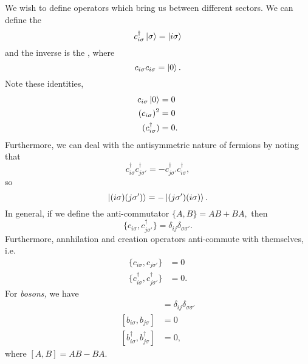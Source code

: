\documentclass{article}
\numberwithin{equation}{section}
\begin{document}
We wish to define operators which bring us between different sectors. We can define the 
\begin{equation*}
    c^\dagger_{i\sigma}\ket{\sigma} = \ket{i\sigma}
\end{equation*}
and the inverse is the , where
\begin{equation*}
    c_{i\sigma}c_{i\sigma} = \ket{0}.
\end{equation*}
Note these identities, 
\begin{align*}
    c_{i\sigma}\ket{0} &= 0 \\ 
    (c_{i\sigma})^2 &= 0 \\ 
    (c^\dagger_{i\sigma}) &= 0.
\end{align*}
Furthermore, we can deal with the antisymmetric nature of fermions by noting that 
\begin{equation*}
    c^\dagger_{i\sigma}c^\dagger_{j\sigma'} = -c^\dagger_{j\sigma'}c^\dagger_{i\sigma},
\end{equation*}
so
\begin{equation*}
    \ket{(i\sigma)(j\sigma')} = -\ket{(j\sigma')(i\sigma)}.
\end{equation*}
In general, if we define the anti-commutator $\{A,B\}=AB+BA,$ then 
\begin{equation}
    \{c_{i\sigma},c^\dagger_{j\sigma'}\} = \delta_{ij}\delta_{\sigma\sigma'}.
\end{equation}
Furthermore, annhilation and creation operators anti-commute with themselves, i.e. 
\begin{align*}
    \{c_{i\sigma}, c_{j\sigma'}\} &= 0 \\
    \{c^\dagger_{i\sigma}, c^\dagger_{j\sigma'}\} &= 0.
\end{align*}
For \textit{bosons,} we have 
\begin{align*}
    [b_{i\sigma},b_{j\sigma}^\dagger] &= \delta_{ij}\delta_{\sigma\sigma'} \\
    [b_{i\sigma},b_{j\sigma}] &= 0 \\
    [b_{i\sigma}^\dagger,b_{j\sigma}^\dagger] &= 0,
\end{align*}
where $[A,B]=AB-BA.$
\end{document}
